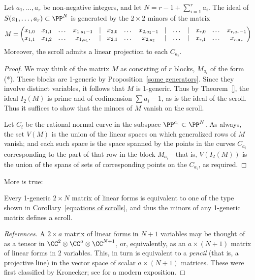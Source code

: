 \begin{corollary}\label{equations of scrolls} Let $a_{1}, \dots, a_{r}$ be non-negative integers, and let $N = r-1+\sum_{i=1}^{r} a_{i}$.
The ideal of $S(a_{1},\dots,a_{r})\subset \PP^{N}$ is generated by the $2\times 2$ minors of the matrix
{\footnotesize
$$
\setcounter{MaxMatrixCols}{20}
M = \begin{pmatrix}
x_{1,0}&x_{1,1}&\dots&x_{1, a_{1}-1}&|&x_{2,0}&\dots&x_{2, a_{2}-1}&|&\dots&|&x_{r,0}&\dots&x_{r, a_{r}-1}\\
x_{1,1}&x_{1,2}&\dots&x_{1, a_{1}}.  &|&x_{2,1}&\dots&x_{2, a_{2}}&|&\dots&|&x_{r,1}&\dots&x_{r, a_{r}}
\end{pmatrix}
$$
}
Moreover, the scroll admits a linear projection to each $C_{a_i}$.
\end{corollary}

\begin{proof} We may think of the matrix $M$ as consisting of $r$ blocks, $M_{a_{i}}$ of the form (*). These blocks are 1-generic by Proposition~\ref{some generators}. Since they involve distinct variables, it follows that $M$ is 1-generic. Thus by
Theorem~\ref{}, the ideal $I_{2}(M)$ is prime and of codimension $\sum a_{i}-1$, as is the ideal of the scroll. Thus it suffices to show that the minors of $M$ vanish on the scroll.

Let $C_{i}$ be the rational normal curve in the subspace $\PP^{a_{i}}\subset\PP^{N}$.
As always, the set $V(M)$ is the union of the linear spaces on which generalized rows of $M$ vanish; and each such space is the space spanned by the points in the curves $C_{a_{i}}$ corresponding to the part of that row in the block $M_{a_{i}}$---that is, $V(I_{2}(M))$ is the union of the spans of sets of corresponding points on the $C_{a_{i}}$, as required.
\end{proof}

More is true: 
\begin{fact}
 Every
 1-generic $2 \times N$ matrix of linear forms is equivalent to one of the type shown in
Corollary~\ref{equations of scrolls}, and thus the minors of any 1-generic matrix defines a scroll. 
\end{fact}

\begin{proof}[References]
A $2\times a$ matrix of linear forms in $N+1$ variables may be thought of as a tensor
in $\CC^{2}\otimes \CC^{a}\otimes \CC^{N+1}$, or, equivalently, as an $a\times (N+1)$ matrix of linear forms in 2 variables. This, in turn is equivalent to a \emph{pencil} (that is, a projective line) in the vector space of scalar $a\times (N+1)$ matrices. These were first classified by Kronecker; see 
\cite[Theorems *** and ***]{Gantmacher} for a modern exposition. 
\end{proof}

